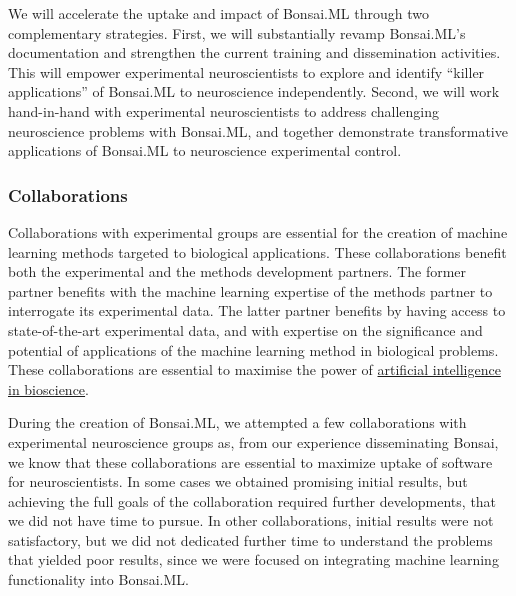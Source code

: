 
We will accelerate the uptake and impact of Bonsai.ML through two complementary
strategies.
%
First, we will substantially revamp Bonsai.ML's documentation and strengthen
the current training and dissemination activities. This will empower
experimental neuroscientists to explore and identify ``killer applications''
of Bonsai.ML to neuroscience independently.
%
Second, we will work hand-in-hand with experimental neuroscientists to address
challenging neuroscience problems with Bonsai.ML, and together demonstrate
transformative applications of Bonsai.ML to neuroscience experimental control.
%

\subsubsection{Collaborations}

Collaborations with experimental groups are essential for the creation of
machine learning methods targeted to biological applications. These
collaborations benefit both the experimental and the methods development
partners.
%
The former partner benefits with the machine learning expertise of the methods
partner to interrogate its experimental data.
%
The latter partner benefits by having access to state-of-the-art experimental
data, and with expertise on the significance and potential of applications of
the machine learning method in biological problems.
%
These collaborations are essential to maximise the power of
\href{https://www.ukri.org/what-we-do/browse-our-areas-of-investment-and-support/artificial-intelligence-in-bioscience/}{artificial
intelligence in bioscience}.

During the creation of Bonsai.ML, we attempted a few collaborations with
experimental neuroscience groups as, from our experience disseminating Bonsai,
we know that these collaborations are essential to maximize uptake of software
for neuroscientists.
%
In some cases we obtained promising initial results, but achieving the full
goals of the collaboration required further developments, that we did not have
time to pursue.
%
In other collaborations, initial results were not satisfactory, but we did not
dedicated further time to understand the problems that yielded poor results,
since we were focused on integrating machine learning functionality into
Bonsai.ML.

